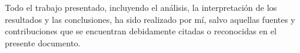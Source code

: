 \clearpage
\thispagestyle{empty}

Todo el trabajo presentado, incluyendo el análisis, la interpretación de los
resultados y las conclusiones, ha sido realizado por mí, salvo aquellas fuentes y contribuciones que se encuentran debidamente citadas o reconocidas
en el presente documento.

\clearpage
